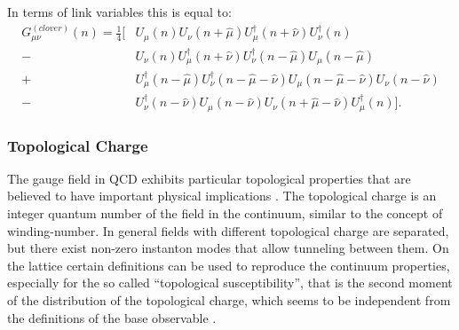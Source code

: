 In terms of link variables this is equal to:
\begin{align}
    G_{\mu\nu}^{(clover)}(n)=\frac{1}{4}\bigg[  &U_\mu(n)U_\nu(n+\hat\mu)U^\dagger_\mu(n+\hat\nu)U^\dagger_\nu(n)\\\nonumber
    - &U_\nu(n)U^\dagger_\mu(n+\hat\nu)U^\dagger_\nu(n-\hat\mu)U_\mu(n-\hat\mu)\\\nonumber
    + &U^\dagger_\mu(n-\hat\mu)U^\dagger_\nu(n-\hat\mu-\hat\nu)U_\mu(n-\hat\mu-\hat\nu)U_\nu(n-\hat\nu)\\\nonumber
    - &U^\dagger_\nu(n-\hat\nu)U_\mu(n-\hat\nu)U_\nu(n+\hat\mu-\hat\nu)U^\dagger_\mu(n) \bigg].
\end{align}
 

\subsubsection{Topological Charge}
The gauge field in QCD exhibits particular topological properties that are believed to have important physical implications \cite{witten_current_1979,di_giacomo_topology_1997}. The topological charge is an integer quantum number of the field in the continuum, similar to the concept of winding-number. In general fields with different topological charge are separated, but there exist non-zero instanton modes \cite{schafer_instantons_1998} that allow tunneling between them.
On the lattice certain definitions can be used to reproduce the continuum properties, especially for the so called ``topological susceptibility'', that is the second moment of the distribution of the topological charge, which seems to be independent from the definitions of the base observable \cite{alexandrou_comparison_2017,gross_qcd_1981}. 



